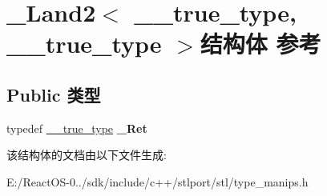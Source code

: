 \hypertarget{struct___land2_3_01____true__type_00_01____true__type_01_4}{}\section{\+\_\+\+Land2$<$ \+\_\+\+\_\+true\+\_\+type, \+\_\+\+\_\+true\+\_\+type $>$结构体 参考}
\label{struct___land2_3_01____true__type_00_01____true__type_01_4}
\subsection*{Public 类型}
\begin{DoxyCompactItemize}
\item 
\mbox{\label{struct___land2_3_01____true__type_00_01____true__type_01_4_ad5b0b2035933ff41576b94243839376b}} 
typedef \hyperlink{struct____true__type}{\+\_\+\+\_\+true\+\_\+type} {\bfseries \+\_\+\+Ret}
\end{DoxyCompactItemize}


该结构体的文档由以下文件生成\+:\begin{DoxyCompactItemize}
\item 
E\+:/\+React\+O\+S-\/0../sdk/include/c++/stlport/stl/type\+\_\+manips.\+h\end{DoxyCompactItemize}
